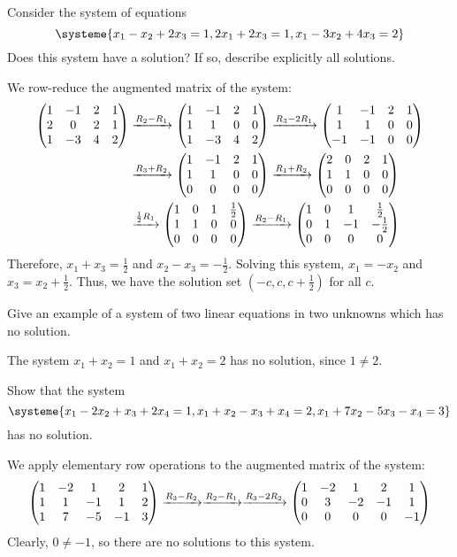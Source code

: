 \begin{xca}
  Consider the system of equations
  \[ \systeme{x_1 - x_2 + 2x_3 = 1, 2x_1 + 2x_3 = 1, x_1 - 3x_2 + 4x_3 = 2} \]
  Does this system have a solution? If so, describe explicitly all solutions.
\end{xca}
\begin{prf}
  We row-reduce the augmented matrix of the system:
  \begin{equation*}
    \begin{split}
      \mqty(1&-1&2&1 \\ 2&0&2&1 \\ 1&-3&4&2)
      & \xto{R_2 - R_1} \mqty(1&-1&2&1 \\ 1&1&0&0 \\ 1&-3&4&2)
      \xto{R_3 - 2R_1} \mqty(1&-1&2&1 \\ 1&1&0&0 \\ -1&-1&0&0) \\
      & \xto{R_3 + R_2} \mqty(1&-1&2&1 \\ 1&1&0&0 \\ 0&0&0&0)
      \xto{R_1 + R_2} \mqty(2&0&2&1 \\ 1&1&0&0 \\ 0&0&0&0) \\
      & \xto{\frac12 R_1} \mqty(1&0&1&\frac12 \\ 1&1&0&0 \\ 0&0&0&0)
      \xto{R_2 - R_1} \mqty(1&0&1&\frac12 \\ 0&1&-1&-\frac12 \\ 0&0&0&0)
    \end{split}
  \end{equation*}
  Therefore, $x_1 + x_3 = \frac12$ and $x_2 - x_3 = -\frac12$.
  Solving this system, $x_1 = -x_2$ and $x_3 = x_2 + \frac12$.
  Thus, we have the solution set $(-c,c,c+\frac12)$ for all $c$.
\end{prf}

\begin{xca}
  Give an example of a system of two linear equations in two unknowns which has no solution.
\end{xca}
\begin{sol}
  The system $x_1 + x_2 = 1$ and $x_1 + x_2 = 2$ has no solution, since $1 \neq 2$.
\end{sol}

\begin{xca}
  Show that the system
  \[ \systeme{x_1 - 2x_2 + x_3 + 2x_4 = 1, x_1 + x_2 - x_3 + x_4 = 2, x_1 + 7x_2 - 5x_3 - x_4 = 3} \]
  has no solution.
\end{xca}
\begin{prf}
  We apply elementary row operations to the augmented matrix of the system:
  \begin{equation*}
    \mqty(1&-2&1&2&1 \\ 1&1&-1&1&2 \\ 1&7&-5&-1&3)
    \xto{R_3 - R_2}
    \xto{R_2 - R_1}
    \xto{R_3 - 2R_2} \mqty(1&-2&1&2&1 \\ 0&3&-2&-1&1 \\ 0&0&0&0&-1)
  \end{equation*}
  Clearly, $0 \neq -1$, so there are no solutions to this system.
\end{prf}

